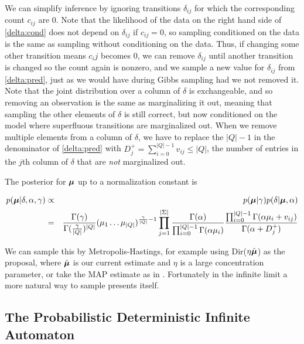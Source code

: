 We can simplify inference by ignoring transitions $\delta_{ij}$ for which the corresponding count $c_{ij}$ are 0.  Note that the likelihood of the data on the right hand side of \eqref{delta:cond} does not depend on $\delta_{ij}$ if $c_{ij} = 0$, so sampling conditioned on the data is the same as sampling without conditioning on the data.  Thus, if changing some other transition means $c_ij$ becomes 0, we can remove $\delta_{ij}$ until another transition is changed so the count again is nonzero, and we sample a new value for $\delta_{ij}$ from \eqref{delta:pred}, just as we would have during Gibbs sampling had we not removed it.  Note that the joint distribution over a column of $\delta$ is exchangeable, and so removing an observation is the same as marginalizing it out, meaning that sampling the other elements of $\delta$ is still correct, but now conditioned on the model where superfluous transitions are marginalized out.  When we remove multiple elements from a column of $\delta$, we have to replace the $|Q| - 1$ in the denominator of \eqref{delta:pred} with $D^+_j = \sum_{i=0}^{|Q|-1}v_{ij} \leq |Q|$, the number of entries in the $j$th column of $\delta$ that are {\em not} marginalized out.

The posterior for $\bmu$ up to a normalization constant is

\begin{eqnarray}
p(\bmu|\delta,\alpha,\gamma) & \propto & p(\bmu|\gamma) p(\delta|\bmu,\alpha)\nonumber \\
& = & \frac{\Gamma(\gamma)}{\Gamma(\frac{\gamma}{|Q|})^{|Q|}}(\mu_1\ldots\mu_{|Q|})^{\frac{\gamma}{|Q|}-1}\prod_{j=1}^{|\Sigma|} \frac{\Gamma(\alpha)}{\prod_{i=0}^{|Q|-1}\Gamma(\alpha\mu_i)} \frac{\prod_{i=0}^{|Q|-1} \Gamma(\alpha\mu_i + v_{ij})}{\Gamma(\alpha + D^+_j)}
\end{eqnarray}

We can sample this by Metropolis-Hastings, for example using Dir($\eta\hat\bmu$) as the proposal, where $\hat\bmu$ is our current estimate and $\eta$ is a large concentration parameter, or take the MAP estimate as in \cite{Mackay1995}.  Fortunately in the infinite limit a more natural way to sample presents itself.
 
 \subsection{The Probabilistic Deterministic Infinite Automaton}
 
